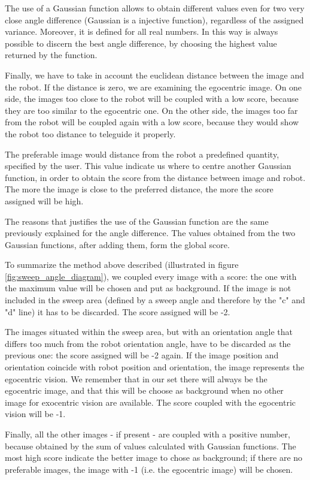 %
The use of a Gaussian function allows to obtain different values even for two very close angle difference
(Gaussian is a injective function), regardless of the assigned variance. Moreover, it is defined for all real
numbers.
In this way is always possible to discern the best angle difference, by choosing the highest value returned by
the function.
%

%
Finally, we have to take in account the euclidean distance between the image and the robot. If the distance is
zero, we are examining the egocentric image. On one side, the images too close to the robot will be coupled
with a low score, because they are too similar to the egocentric one. On the other side, the images too far
from the robot will be coupled again with a low score, because they would show the robot too distance to
teleguide it properly.
%

%
The preferable image would distance from the robot a predefined quantity, specified by the user. This value
indicate us where to centre another Gaussian function, in order to obtain the score from the distance between
image and robot. The more the image is close to the preferred distance, the more the score assigned will be high.
%

%
The reasons that justifies the use of the Gaussian function are the same previously explained for the angle
difference. The values obtained from the two Gaussian functions, after adding them, form the global score.
%

%
To summarize the method above described (illustrated in figure \ref{fig:sweep_angle_diagram}), we coupled
every image with a score: the one with the maximum value will be chosen and put as background. If the image is
not included in the sweep area (defined by a sweep angle and therefore by the "c" and "d" line) it has to be
discarded. The score assigned will be -2.
%

%
The images situated within the sweep area, but with an orientation angle that differs too much from the robot
orientation angle, have to be discarded as the previous one: the score assigned will be -2 again.
If the image position and orientation coincide with robot position and orientation, the image represents the
egocentric vision. We remember that in our set there will always be the egocentric image, and that this will be
choose as background when no other image for exocentric vision are available. The score coupled with the egocentric 
vision will be -1.
%

%
Finally, all the other images - if present - are coupled with a positive number, because obtained by the sum of
values calculated with Gaussian functions. The most high score indicate the better image to chose as background;
if there are no preferable images, the image with -1 (i.e. the egocentric image) will be chosen.
%

